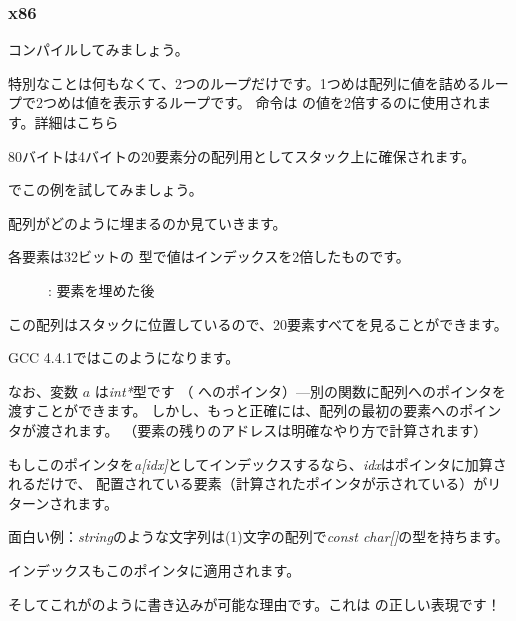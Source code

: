 ﻿\subsubsection{x86}


コンパイルしてみましょう。




特別なことは何もなくて、2つのループだけです。1つめは配列に値を詰めるループで2つめは値を表示するループです。
命令は \ECX の値を2倍するのに使用されます。詳細はこちら~

80バイトは4バイトの20要素分の配列用としてスタック上に確保されます。

\clearpage
\olly でこの例を試してみましょう。
\myindex{\olly}

配列がどのように埋まるのか見ていきます。

各要素は32ビットの \Tint 型で値はインデックスを2倍したものです。

\begin{figure}[H]
\centering
{}
\caption{\olly: 要素を埋めた後}
\label{fig:array_simple_olly}
\end{figure}

この配列はスタックに位置しているので、20要素すべてを見ることができます。


GCC 4.4.1ではこのようになります。



なお、変数 $a$ は\emph{int*}型です
（\Tint{} へのポインタ）---別の関数に配列へのポインタを渡すことができます。
しかし、もっと正確には、配列の最初の要素へのポインタが渡されます。
（要素の残りのアドレスは明確なやり方で計算されます）

もしこのポインタを\emph{a[idx]}としてインデックスするなら、\emph{idx}はポインタに加算されるだけで、
配置されている要素（計算されたポインタが示されている）がリターンされます。

面白い例：\emph{string}のような文字列は(1)文字の配列で\emph{const char[]}の型を持ちます。

インデックスもこのポインタに適用されます。

そしてこれがのように書き込みが可能な理由です。これは \CCpp の正しい表現です！
